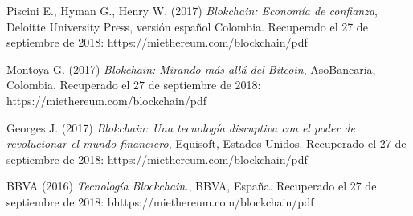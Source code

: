 \documentclass[12pt,letterpaper]{article}
\begin{document}
\begin{thebibliography}{}
	
	 Piscini E., Hyman G., Henry W. (2017) \textit{Blokchain: Economía de confianza}, Deloitte University Press, versión español Colombia. Recuperado el 27 de septiembre de 2018:  https://miethereum.com/blockchain/pdf
	
	 Montoya G. (2017) \textit{Blokchain: Mirando más allá del Bitcoin}, AsoBancaria, Colombia. Recuperado el 27 de septiembre de 2018: https://miethereum.com/blockchain/pdf
	
	 Georges J. (2017) \textit{Blokchain: Una tecnología disruptiva con el poder de revolucionar el mundo financiero}, Equisoft, Estados Unidos. Recuperado el 27 de septiembre de 2018: https://miethereum.com/blockchain/pdf
	
	 BBVA (2016) \textit{Tecnología Blockchain.}, BBVA, España. Recuperado el 27 de septiembre de 2018: bhttps://miethereum.com/blockchain/pdf
	
	
\end{thebibliography}
\end{document}
